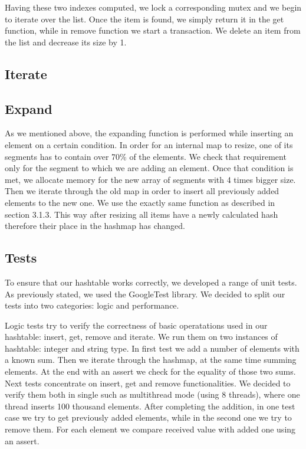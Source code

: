     Having these two indexes computed, we lock a corresponding mutex and we begin to iterate over the list. Once the item is found, we simply return it in the get function, while in remove function we start a transaction. We delete an item from the list and decrease its size by 1.
        
        
\subsection{Iterate}
    
\subsection{Expand}
    As we mentioned above, the expanding function is performed while inserting an element on a certain condition. In order for an internal map to resize, one of its segments has to contain over 70\% of the elements. We check that requirement only for the segment to which we are adding an element. Once that condition is met, we allocate memory for the new array of segments with 4 times bigger size. Then we iterate through the old map in order to insert all previously added elements to the new one. We use the exactly same function as described in section 3.1.3. This way after resizing all items have a newly calculated hash therefore their place in the hashmap has changed.

\subsection{Tests}

    To ensure that our hashtable works correctly, we developed a range of unit tests. As previously stated, we used the GoogleTest library. We decided to split our tests into two categories: logic and performance.
    
    Logic tests try to verify the correctness of basic operatations used in our hashtable: insert, get, remove and iterate. We run them on two instances of hashtable: integer and string type. In first test we add a number of elements with a known sum. Then we iterate through the hashmap, at the same time summing elements. At the end with an assert we check for the equality of those two sums. Next tests concentrate on insert, get and remove functionalities. We decided to verify them both in single such as multithread mode (using 8 threads), where one thread inserts 100 thousand elements. After completing the addition, in one test case we try to get previously added elements, while in the second one we try to remove them. For each element we compare received value with added one using an assert.
    
